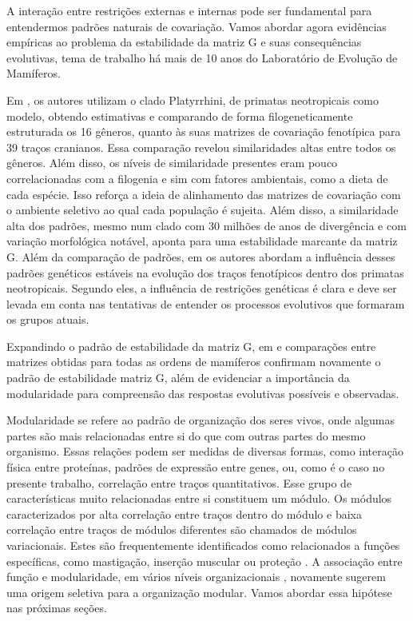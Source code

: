 A interação entre restrições externas e internas pode ser fundamental
para entendermos padrões naturais de covariação. 
Vamos abordar agora evidências empíricas ao problema da estabilidade da
matriz G e suas consequências evolutivas, tema de trabalho há mais de 10
anos do Laboratório de Evolução de Mamíferos. 

Em \cite{Marroig2001}, os autores utilizam o clado Platyrrhini, de
primatas neotropicais como modelo, obtendo estimativas e comparando de
forma filogeneticamente estruturada os 16 gêneros, quanto às suas
matrizes de covariação fenotípica para 39 traços cranianos. 
Essa comparação revelou similaridades altas entre todos os gêneros. 
Além disso, os níveis de similaridade presentes eram pouco
correlacionadas com a filogenia e sim com fatores ambientais, como a
dieta de cada espécie. 
Isso reforça a ideia de alinhamento das matrizes de covariação com o
ambiente seletivo ao qual cada população é sujeita. 
Além disso, a similaridade alta dos padrões, mesmo num clado com 30
milhões de anos de divergência e com variação morfológica notável,
aponta para uma estabilidade marcante da matriz G. 
Além da comparação de padrões, em \cite{Marroig2005, Marroig2010} os
autores abordam a influência desses padrões genéticos estáveis na
evolução dos traços fenotípicos dentro dos primatas neotropicais. 
Segundo eles, a influência de restrições genéticas é clara e deve ser
levada em conta nas tentativas de entender os processos evolutivos que
formaram os grupos atuais. 

Expandindo o padrão de estabilidade da matriz G, em \cite{Porto2008} e
\cite{Marroig2009} comparações entre matrizes obtidas para todas as
ordens de mamíferos confirmam novamente o padrão de estabilidade matriz
G, além de evidenciar a importância da modularidade para compreensão das
respostas evolutivas possíveis e observadas. 

Modularidade se refere ao padrão de organização dos seres vivos, onde
algumas partes são mais relacionadas entre si do que com outras partes
do mesmo organismo. 
Essas relações podem ser medidas de diversas formas, como interação física
entre proteínas, padrões de expressão entre genes, ou, como é o caso
no presente trabalho, correlação entre traços quantitativos. 
Esse grupo de características muito relacionadas entre si constituem um
módulo. 
Os módulos caracterizados por alta correlação entre traços dentro do
módulo e baixa correlação entre traços de módulos diferentes são
chamados de módulos variacionais. 
Estes são frequentemente identificados como relacionados a funções
específicas, como mastigação, inserção muscular ou proteção
\citep{Cheverud1997}. 
A associação entre função e modularidade, em vários níveis
organizacionais \citep{Costanzo2010}, novamente sugerem uma origem
seletiva para a organização modular. 
Vamos abordar essa hipótese nas próximas seções. 

